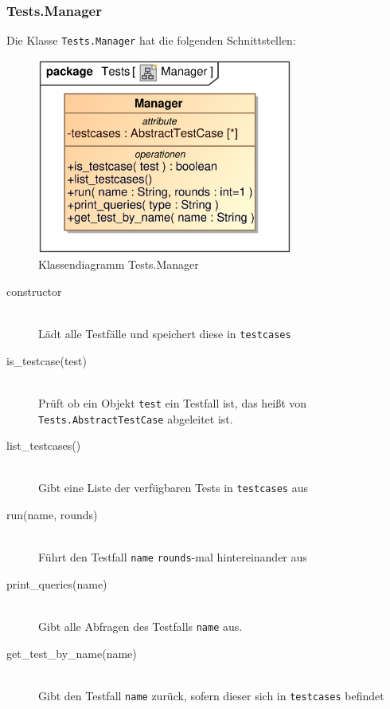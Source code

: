 \subsubsection{Tests.Manager}
Die Klasse \verb|Tests.Manager| hat die folgenden Schnittstellen:

\begin{figure}[H]
    \myfloatalign
    \includegraphics[width=0.75\textwidth]{gfx/MtGDeepAnalysis/Manager.eps}
    \caption{Klassendiagramm Tests.Manager}
    \label{fig:class:tests.manager}
\end{figure}

\begin{description}
    \item[constructor] \hfill \\
    Lädt alle Testfälle und speichert diese in \verb|testcases|
    
    \item[is\_testcase(test)] \hfill \\
    Prüft ob ein Objekt \verb|test| ein Testfall ist, das heißt von \verb|Tests.AbstractTestCase| abgeleitet ist.
    
    \item[list\_testcases()] \hfill \\
    Gibt eine Liste der verfügbaren Tests in \verb|testcases| aus
    
    \item[run(name, rounds)] \hfill \\
    Führt den Testfall \verb|name| \verb|rounds|-mal hintereinander aus
    
    \item[print\_queries(name)] \hfill \\
    Gibt alle Abfragen des Testfalls \verb|name| aus.
    
    \item[get\_test\_by\_name(name)] \hfill \\
    Gibt den Testfall \verb|name| zurück, sofern dieser sich in \verb|testcases| befindet
\end{description}

